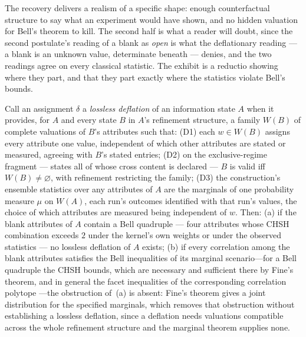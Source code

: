 The recovery delivers a realism of a specific shape: enough counterfactual structure to say what an experiment would have shown, and no hidden valuation for Bell's theorem to kill. The second half is what a reader will doubt, since the second postulate's reading of a blank as \emph{open} is what the deflationary reading --- a blank is an unknown value, determinate beneath --- denies, and the two readings agree on every classical statistic. The exhibit is a reductio showing where they part, and that they part exactly where the statistics violate Bell's bounds.

\begin{theorem}\label{thm:deflation}
Call an assignment $\delta$ a \emph{lossless deflation} of an information state $A$ when it provides, for $A$ and every state $B$ in $A$'s refinement structure, a family $W(B)$ of complete valuations of $B$'s attributes such that: (D1) each $w \in W(B)$ assigns every attribute one value, independent of which other attributes are stated or measured, agreeing with $B$'s stated entries; (D2) on the exclusive-regime fragment --- states all of whose cross content is declared --- $B$ is valid iff $W(B) \neq \varnothing$, with refinement restricting the family; (D3) the construction's ensemble statistics over any attributes of $A$ are the marginals of one probability measure $\mu$ on $W(A)$, each run's outcomes identified with that run's values, the choice of which attributes are measured being independent of $w$. Then: (a) if the blank attributes of $A$ contain a Bell quadruple --- four attributes whose CHSH combination exceeds $2$ under the kernel's own weights or under the observed statistics --- no lossless deflation of $A$ exists; (b) if every correlation among the blank attributes satisfies the Bell inequalities of its marginal scenario---for a Bell quadruple the CHSH bounds, which are necessary and sufficient there by Fine's theorem, and in general the facet inequalities of the corresponding correlation polytope \cite{pitowsky1994}---the obstruction of~(a) is absent: Fine's theorem gives a joint distribution for the specified marginals, which removes that obstruction without establishing a lossless deflation, since a deflation needs valuations compatible across the whole refinement structure and the marginal theorem supplies none.
\end{theorem}
